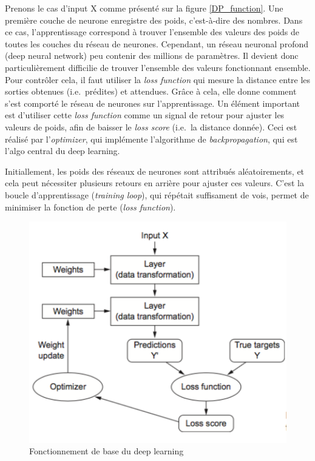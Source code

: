 \documentclass[
]{article}
\begin{document}
Prenons le cas d'input X comme présenté sur la figure \ref{DP_function}.
Une première couche de neurone enregistre des poids, c'est-à-dire des
nombres. Dans ce cas, l'apprentissage correspond à trouver l'ensemble
des valeurs des poids de toutes les couches du réseau de neurones.
Cependant, un réseau neuronal profond (deep neural network) peu contenir
des millions de paramètres. Il devient donc particulièrement difficilie
de trouver l'ensemble des valeurs fonctionnant ensemble. Pour contrôler
cela, il faut utiliser la \emph{loss function} qui mesure la distance
entre les sorties obtenues (i.e.~prédites) et attendues. Grâce à cela,
elle donne comment s'est comporté le réseau de neurones sur
l'apprentissage. Un élément important est d'utiliser cette \emph{loss
function} comme un signal de retour pour ajuster les valeurs de poids,
afin de baisser le \emph{loss score} (i.e.~la distance donnée). Ceci est
réalisé par l'\emph{optimizer}, qui implémente l'algorithme de
\emph{backpropagation}, qui est l'algo central du deep learning.

Initiallement, les poids des réseaux de neurones sont attribués
aléatoirements, et cela peut nécessiter plusieurs retours en arrière
pour ajuster ces valeurs. C'est la boucle d'apprentissage
(\emph{training loop}), qui répétait suffisament de vois, permet de
minimiser la fonction de perte (\emph{loss function}).

\begin{figure}[H]
\includegraphics[width=5.65in]{DP/Function_DP} \caption{\label{DP_function} Fonctionnement de base du deep learning}\label{fig:unnamed-chunk-6}
\end{figure}
\end{document}
